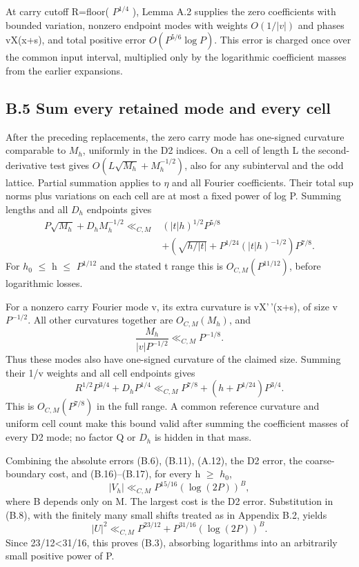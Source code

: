 \documentclass[11pt,a4paper]{article}
\begin{document}
At carry cutoff R=floor( \(P^{1/4}\) ), Lemma A.2 supplies the zero
coefficients with bounded variation, nonzero endpoint modes with weights
\(O(1/|v|)\) and phases vX(x+s), and total positive error
\(O(P^{5/6} \log P)\). This error is charged once over the common input
interval, multiplied only by the logarithmic coefficient masses from the
earlier expansions.

\subsection{B.5 Sum every retained mode and every
cell}\label{b.5-sum-every-retained-mode-and-every-cell}

After the preceding replacements, the zero carry mode has one-signed
curvature comparable to \(M_h\), uniformly in the D2 indices. On a cell
of length L the second-derivative test gives
\(O(L \sqrt{M_h}+M_h^{-1/2})\), also for any subinterval and the odd
lattice. Partial summation applies to \(\eta\) and all Fourier
coefficients. Their total sup norms plus variations on each cell are at
most a fixed power of log P. Summing lengths and all \(D_h\) endpoints
gives \[
\begin{split}
P\sqrt{M_h}+D_h M_h^{-1/2}
\ll_{C,M}{}&
(|t|h)^{1/2}P^{5/8}\\
&+\left(\sqrt{h/|t|}
+P^{1/24}(|t|h)^{-1/2}\right)P^{7/8}.
\end{split} \tag{B.16}
\] For \(h_0\) \(\le\) h \(\le\) \(P^{1/12}\) and the stated t range
this is \(O_{C,M}(P^{11/12})\), before logarithmic losses.

For a nonzero carry Fourier mode v, its extra curvature is vX'\,'(x+s),
of size \textbar v\textbar{} \(P^{-1/2}\). All other curvatures together
are \(O_{C,M}(M_h)\), and \[
\frac{M_h}{|v|P^{-1/2}}
\ll_{C,M}P^{-1/8}.
\] Thus these modes also have one-signed curvature of the claimed size.
Summing their 1/\textbar v\textbar{} weights and all cell endpoints
gives \[
R^{1/2}P^{3/4}+D_h P^{1/4}
\ll_{C,M}P^{7/8}+(h+P^{1/24})P^{3/4}. \tag{B.17}
\] This is \(O_{C,M}(P^{7/8})\) in the full range. A common reference
curvature and uniform cell count make this bound valid after summing the
coefficient masses of every D2 mode; no factor Q or \(D_h\) is hidden in
that mass.

Combining the absolute errors (B.6), (B.11), (A.12), the D2 error, the
coarse-boundary cost, and (B.16)--(B.17), for every h \(\ge\) \(h_0\),
\[
|V_h|\ll_{C,M}P^{15/16}(\log(2P))^{B}, \tag{B.18}
\] where B depends only on M. The largest cost is the D2 error.
Substitution in (B.8), with the finitely many small shifts treated as in
Appendix B.2, yields \[
|U|^2\ll_{C,M}
P^{23/12}+P^{31/16}(\log(2P))^{B}.
\] Since 23/12\textless31/16, this proves (B.3), absorbing logarithms
into an arbitrarily small positive power of P.
\end{document}
